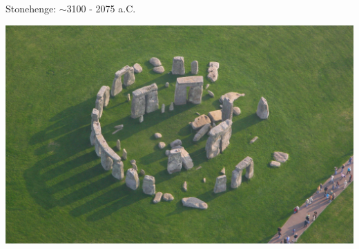 \large
Stonehenge: $\sim$3100 - 2075 a.C.
\begin{center}
	\includegraphics[height=.75\textheight]{./IMG/valuable_europe_265732.jpg}
\end{center}

\vfill
\pagebreak

